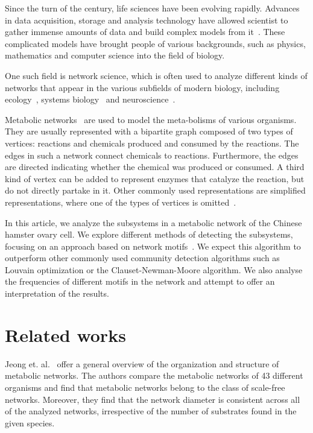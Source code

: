 Since the turn of the century, life sciences have been evolving
rapidly. Advances in data acquisition, storage and analysis technology have
allowed scientist to gather immense amounts of data and build complex models
from it~\cite{modsys}. These complicated models have brought people of various
backgrounds, such as physics, mathematics and computer science into the field
of biology.

One such field is network science, which
is often used to analyze different kinds of networks that appear in the various
subfields of modern biology, including ecology~\cite{proulx2005network}, systems
biology~\cite{barabasi2004network} and neuroscience~\cite{sporns2014contributions}.

Metabolic networks~\cite{jeong2000large} are used to model the meta-bolisms of
various organisms. They are usually represented with a bipartite graph composed
of two types of vertices: reactions and chemicals produced and consumed by the
reactions. The edges in such a network connect chemicals to
reactions. Furthermore, the edges are directed indicating whether the chemical
was produced or consumed. A third kind of vertex can be added to represent
enzymes that catalyze the reaction, but do not directly partake in
it. Other commonly used representations are simplified representations, where
one of the types of vertices is omitted~\cite{newman2010networks}.

In this article, we analyze the subsystems in a metabolic network of the Chinese
hamster ovary cell. We explore different methods of detecting the subsystems,
focusing on an approach based on network motifs~\cite{benson2016higher}. We
expect this algorithm to outperform other commonly used community detection
algorithms such as Louvain optimization or the Clauset-Newman-Moore
algorithm. We also analyse the frequencies of different motifs in the network
and attempt to offer an interpretation of the results.

\section{Related works}
\label{sec:related}

Jeong et. al.~\cite{jeong2000large} offer a general overview of the organization
and structure of metabolic networks. The authors compare the metabolic networks
of 43 different organisms and find that metabolic networks belong to the class
of scale-free networks. Moreover, they find that the network diameter is
consistent across all of the analyzed networks, irrespective of the number of
substrates found in the given species.

